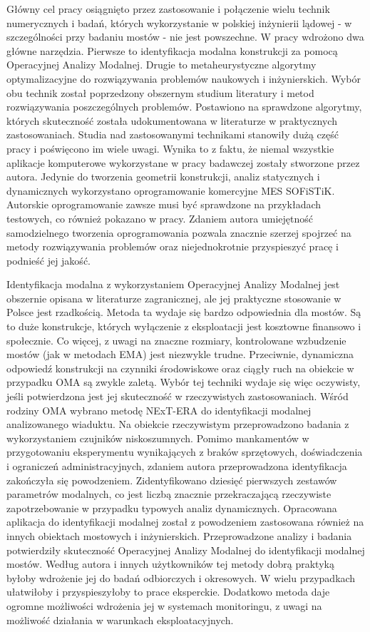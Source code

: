 Główny cel pracy osiągnięto przez zastosowanie i połączenie wielu technik numerycznych i badań, których wykorzystanie w polskiej inżynierii lądowej - w szczególności przy badaniu mostów - nie jest powszechne. W pracy wdrożono dwa główne narzędzia. Pierwsze to identyfikacja modalna konstrukcji za pomocą Operacyjnej Analizy Modalnej. Drugie to metaheurystyczne algorytmy optymalizacyjne do rozwiązywania problemów naukowych i inżynierskich. Wybór obu technik został poprzedzony obszernym studium literatury i metod rozwiązywania poszczególnych problemów. Postawiono na sprawdzone algorytmy, których skuteczność została udokumentowana w literaturze w praktycznych zastosowaniach. Studia nad zastosowanymi technikami stanowiły dużą część pracy i poświęcono im wiele uwagi. Wynika to z faktu, że niemal wszystkie aplikacje komputerowe wykorzystane w pracy badawczej zostały stworzone przez autora. Jedynie do tworzenia geometrii konstrukcji, analiz statycznych i dynamicznych wykorzystano oprogramowanie komercyjne MES SOFiSTiK. Autorskie oprogramowanie zawsze musi być sprawdzone na przykładach testowych, co również pokazano w pracy. Zdaniem autora umiejętność samodzielnego tworzenia oprogramowania pozwala znacznie szerzej spojrzeć na metody rozwiązywania problemów oraz niejednokrotnie przyspieszyć pracę i podnieść jej jakość.

Identyfikacja modalna z wykorzystaniem Operacyjnej Analizy Modalnej jest obszernie opisana w literaturze zagranicznej, ale jej praktyczne stosowanie w Polsce jest rzadkością. Metoda ta wydaje się bardzo odpowiednia dla mostów. Są to duże konstrukcje, których wyłączenie z eksploatacji jest kosztowne finansowo i społecznie. Co więcej, z uwagi na znaczne rozmiary, kontrolowane wzbudzenie mostów (jak w metodach EMA) jest niezwykle trudne. Przeciwnie, dynamiczna odpowiedź konstrukcji na czynniki środowiskowe oraz ciągły ruch na obiekcie w przypadku OMA są zwykle zaletą. Wybór tej techniki wydaje się więc oczywisty, jeśli potwierdzona jest jej skuteczność w rzeczywistych zastosowaniach. Wśród rodziny OMA wybrano metodę NExT-ERA do identyfikacji modalnej analizowanego wiaduktu. Na obiekcie rzeczywistym przeprowadzono badania z wykorzystaniem czujników niskoszumnych. Pomimo mankamentów w przygotowaniu eksperymentu wynikających z braków sprzętowych, doświadczenia i ograniczeń administracyjnych, zdaniem autora przeprowadzona identyfikacja zakończyła się powodzeniem. Zidentyfikowano dziesięć pierwszych zestawów parametrów modalnych, co jest liczbą znacznie przekraczającą rzeczywiste zapotrzebowanie w przypadku typowych analiz dynamicznych. Opracowana aplikacja do identyfikacji modalnej został z powodzeniem zastosowana również na innych obiektach mostowych i inżynierskich. Przeprowadzone analizy i badania potwierdziły skuteczność Operacyjnej Analizy Modalnej do identyfikacji modalnej mostów. Według autora i innych użytkowników tej metody dobrą praktyką byłoby wdrożenie jej do badań odbiorczych i okresowych. W wielu przypadkach ułatwiłoby i przyspieszyłoby to prace eksperckie. Dodatkowo metoda daje ogromne możliwości wdrożenia jej w systemach monitoringu, z uwagi na możliwość działania w warunkach eksploatacyjnych.


